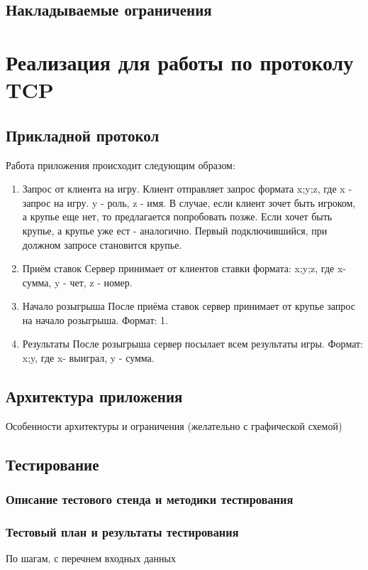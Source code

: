 \documentclass[12pt,a4paper]{report}
\begin{document}
\section{Накладываемые ограничения}

\chapter{Реализация для работы по протоколу TCP}
\section{Прикладной протокол}
\label{protocol_tcp}
Работа приложения происходит следующим образом:
\begin{enumerate}
\item{Запрос от клиента на игру.} Клиент отправляет запрос формата x;y;z, где x - запрос на игру. y - роль, z - имя.
В случае, если клиент зочет быть игроком, а крупье еще нет, то предлагается попробовать позже. Если хочет быть крупье, а крупье уже ест - аналогично. Первый подключившийся, при должном запросе становится крупье.
\item{Приём ставок} Сервер принимает от клиентов ставки формата: x;y;z, где x- сумма, y - чет, z - номер. 
\item{Начало розыгрыша} После приёма ставок сервер принимает от крупье запрос на начало розыгрыша. Формат: 1.
\item{Результаты} После розыгрыша сервер посылает всем результаты игры. Формат: x;y, где x- выиграл, y - сумма.
\end{enumerate}

\section{Архитектура приложения}
Особенности архитектуры и ограничения (желательно с графической схемой)

\section{Тестирование}
\subsection{Описание тестового стенда и методики тестирования}
\subsection{Тестовый план и результаты тестирования}
По шагам, с перечнем входных данных
\end{document}
